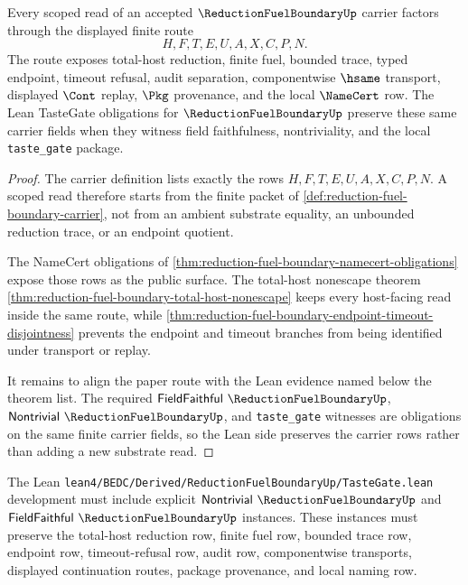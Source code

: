 \begin{theorem}
\label{thm:reduction-fuel-boundary-scoped-substrate-route}
Every scoped read of an accepted $\ReductionFuelBoundaryUp$ carrier factors through the displayed finite route
$$
H,F,T,E,U,A,X,C,P,N .
$$
The route exposes total-host reduction, finite fuel, bounded trace, typed endpoint, timeout refusal, audit separation, componentwise $\hsame$ transport, displayed $\Cont$ replay, $\Pkg$ provenance, and the local $\NameCert$ row. The Lean TasteGate obligations for $\ReductionFuelBoundaryUp$ preserve these same carrier fields when they witness field faithfulness, nontriviality, and the local \texttt{taste\_gate} package.
\end{theorem}
\begin{proof}
The carrier definition lists exactly the rows $H,F,T,E,U,A,X,C,P,N$. A scoped read therefore starts from the finite packet of \autoref{def:reduction-fuel-boundary-carrier}, not from an ambient substrate equality, an unbounded reduction trace, or an endpoint quotient.

The NameCert obligations of \autoref{thm:reduction-fuel-boundary-namecert-obligations} expose those rows as the public surface. The total-host nonescape theorem \autoref{thm:reduction-fuel-boundary-total-host-nonescape} keeps every host-facing read inside the same route, while \autoref{thm:reduction-fuel-boundary-endpoint-timeout-disjointness} prevents the endpoint and timeout branches from being identified under transport or replay.

It remains to align the paper route with the Lean evidence named below the theorem list. The required $\mathsf{FieldFaithful}\ \ReductionFuelBoundaryUp$, $\mathsf{Nontrivial}\ \ReductionFuelBoundaryUp$, and \texttt{taste\_gate} witnesses are obligations on the same finite carrier fields, so the Lean side preserves the carrier rows rather than adding a new substrate read.
\end{proof}

The Lean \texttt{lean4/BEDC/Derived/ReductionFuelBoundaryUp/TasteGate.lean} development must include explicit $\mathsf{Nontrivial}\ \ReductionFuelBoundaryUp$ and $\mathsf{FieldFaithful}\ \ReductionFuelBoundaryUp$ instances. These instances must preserve the total-host reduction row, finite fuel row, bounded trace row, endpoint row, timeout-refusal row, audit row, componentwise transports, displayed continuation routes, package provenance, and local naming row.

